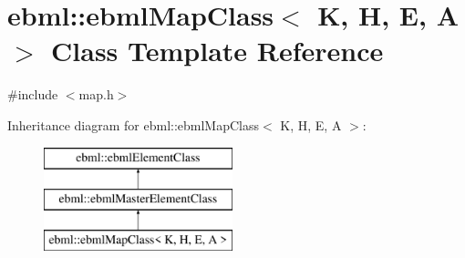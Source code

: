 \hypertarget{classebml_1_1ebmlMapClass}{}\section{ebml\+:\+:ebml\+Map\+Class$<$ K, H, E, A $>$ Class Template Reference}
\label{classebml_1_1ebmlMapClass}


{\ttfamily \#include $<$map.\+h$>$}

Inheritance diagram for ebml\+:\+:ebml\+Map\+Class$<$ K, H, E, A $>$\+:\begin{figure}[H]
\begin{center}
\leavevmode
\includegraphics[height=3.000000cm]{classebml_1_1ebmlMapClass}
\end{center}
\end{figure}
